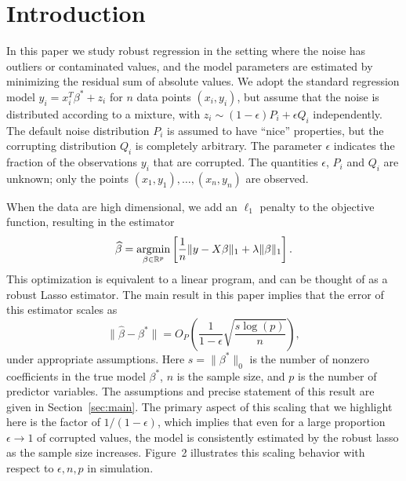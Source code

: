 
\section{Introduction}
\label{sec:intro}

In this paper we study robust regression in the setting where the noise has outliers or contaminated values,
and the model parameters are estimated by minimizing the residual sum of absolute values. We adopt the standard regression model $y_i=x_i^T\beta^*+z_i$ for $n$ data points $(x_i,y_i)$, but assume that the noise is distributed according to a mixture, with $z_i\sim (1-\epsilon)P_i+\epsilon Q_i$ independently. The default noise distribution $P_i$ is assumed to have ``nice'' properties, but the corrupting distribution
$Q_i$ is completely arbitrary. The parameter $\epsilon$ indicates the fraction of the observations $y_i$ that are corrupted. The quantities $\epsilon$, $P_i$ and $Q_i$ are unknown; only the points $(x_1, y_1), \ldots, (x_n, y_n)$ are observed.



When the data are high dimensional, we add an $\ell_1$ penalty to the objective function, resulting in the estimator
\begin{equation}
  \wh{\beta}=\argmin_{\beta\in\mathbb{R}^p}\left[\frac{1}{n}\|y-X\beta\|_1+\lambda\|\beta\|_1\right].
  \label{robustlasso}
\end{equation}
This optimization is equivalent to a linear program, and can be thought of as a robust Lasso estimator. The main result in this paper implies that the error of this estimator scales as
\begin{equation}
  \|\hat \beta - \beta^*\|  = O_P\left(\frac{1}{1-\epsilon} \sqrt{\frac{s\log(p)}{n}}\right),
\end{equation}
under appropriate assumptions.
Here $s = \|\beta^*\|_0$ is the number of nonzero coefficients in the true model $\beta^*$, $n$ is the sample size, and $p$ is the number of predictor variables. The assumptions and precise statement of this result are given in Section~\ref{sec:main}. The primary aspect of this scaling that we highlight here is the factor of $1/(1-\epsilon)$, which implies that even for a large proportion $\epsilon \to 1$ of corrupted values, the model is consistently estimated by the robust lasso as the sample size increases. Figure~2 illustrates this scaling behavior with respect to $\epsilon, n, p$ in simulation.

